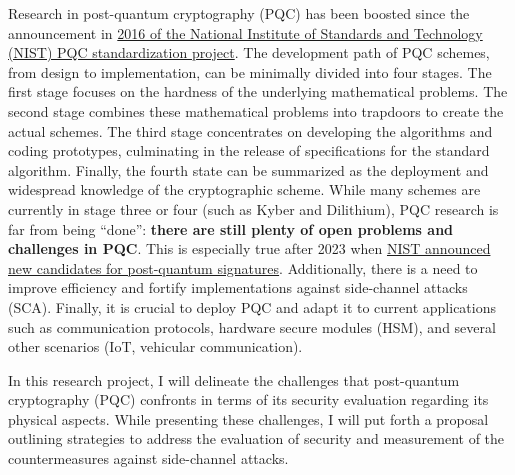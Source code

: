 
Research in post-quantum cryptography (PQC) has been boosted since the announcement in 
\href{https://csrc.nist.gov/projects/post-quantum-cryptography/post-quantum-cryptography-standardization/call-for-proposals}
{2016 of the National Institute of Standards and Technology (NIST) PQC standardization project}. The development path of 
PQC schemes, from design to implementation, can be minimally divided into four stages. The first 
stage focuses on the hardness of the underlying mathematical problems. The second stage combines 
these mathematical problems into trapdoors to create the actual schemes. The third stage 
concentrates on developing the algorithms and coding prototypes, culminating in the 
release of specifications for the standard algorithm. Finally, the fourth state can be 
summarized as the deployment and widespread knowledge of the cryptographic scheme. 
While many schemes are currently in stage three or four (such as Kyber and Dilithium), 
PQC research is far from being ``done'': 
\textbf{there are still plenty of open problems and challenges in PQC}. 
This is especially true after 2023 when
 \href{https://www.nist.gov/news-events/news/2023/07/nist-announces-additional-digital-signature-candidates-pqc-standardization}
 {NIST announced new candidates for post-quantum signatures}. Additionally, there is a need to improve efficiency and fortify 
 implementations against side-channel attacks (SCA). Finally, it is crucial to deploy PQC and adapt it to 
 current applications such as communication protocols, hardware secure modules (HSM), and several other
  scenarios (IoT, vehicular communication).

In this research project, I will delineate the challenges that post-quantum cryptography (PQC) confronts in terms of its 
security evaluation regarding its physical aspects. While presenting these challenges, I will put forth a 
proposal outlining strategies to address the evaluation of security and measurement of the countermeasures against side-channel 
attacks. 

